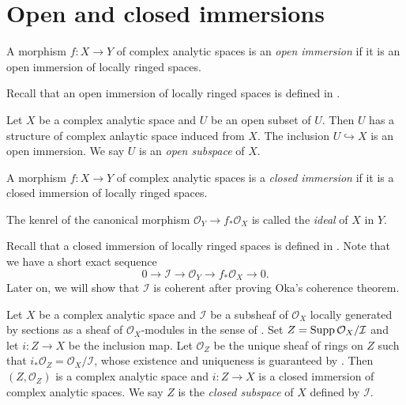 \section{Open and closed immersions}

\begin{definition}
    A morphism $f:X\rightarrow Y$ of complex analytic spaces is an \emph{open immersion} if it is an open immersion of locally ringed spaces.
\end{definition}
Recall that an open immersion of locally ringed spaces is defined in \cite[\href{https://stacks.math.columbia.edu/tag/01HE}{Tag 01HE}]{stacks-project}.

\begin{example}
    Let $X$ be a complex analytic space and $U$ be an open subset of $U$. Then $U$ has a structure of complex anlaytic space induced from $X$. The inclusion $U\hookrightarrow X$ is an open immersion. We say $U$ is an \emph{open subspace} of $X$.
\end{example}

\begin{definition}
    A morphism $f:X\rightarrow Y$ of complex analytic spaces is a \emph{closed immersion} if it is a closed immersion of locally ringed spaces.

    The kenrel of the canonical morphism $\mathcal{O}_Y\rightarrow f_*\mathcal{O}_X$ is called the \emph{ideal} of $X$ in $Y$.
\end{definition}
Recall that a closed immersion of locally ringed spaces is defined in \cite[\href{https://stacks.math.columbia.edu/tag/01HK}{Tag 01HK}]{stacks-project}. Note that we have a short exact sequence
\[
    0\rightarrow \mathcal{I} \rightarrow \mathcal{O}_Y\rightarrow f_*\mathcal{O}_X\rightarrow 0.
\]
Later on, we will show that $\mathcal{I}$ is coherent after proving Oka's coherence theorem.

\begin{example}
    Let $X$ be a complex analytic space and $\mathcal{I}$ be a subsheaf of $\mathcal{O}_X$ locally generated by sections as a sheaf of $\mathcal{O}_X$-modules in the sense of \cite[\href{https://stacks.math.columbia.edu/tag/01B2}{Tag 01B2}]{stacks-project}. Set $Z=\operatorname{Supp}\mathcal{O}_X/\mathcal{I}$ and let $i:Z\rightarrow X$ be the inclusion map. Let $\mathcal{O}_Z$ be the unique sheaf of rings on $Z$ such that $i_*\mathcal{O}_Z=\mathcal{O}_X/\mathcal{I}$, whose existence and uniqueness is guaranteed by \cite[\href{https://stacks.math.columbia.edu/tag/01AX}{Tag 01AX}]{stacks-project}. Then $(Z,\mathcal{O}_Z)$ is a complex analytic space and $i:Z\rightarrow X$ is a closed immersion of complex analytic spaces. We say $Z$ is the \emph{closed subspace} of $X$ defined by $\mathcal{I}$.
\end{example}

